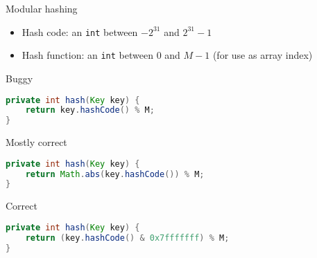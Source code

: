\documentclass[8pt,a4paper,compress]{beamer}
\begin{document}
\begin{frame}[fragile]
Modular hashing
\begin{itemize}
\item Hash code: an \lstinline{int} between $-2^{31}$ and $2^{31} - 1$

\item Hash function: an \lstinline{int} between 0 and $M-1$ (for use as array index)
\end{itemize}

\bigskip

Buggy
\begin{lstlisting}[language=Java]
private int hash(Key key) { 
    return key.hashCode() % M; 
}
\end{lstlisting}

\bigskip

Mostly correct
\begin{lstlisting}[language=Java]
private int hash(Key key) { 
    return Math.abs(key.hashCode()) % M;  
}
\end{lstlisting}


\bigskip

Correct
\begin{lstlisting}[language=Java]
private int hash(Key key) { 
    return (key.hashCode() & 0x7fffffff) % M;
}
\end{lstlisting}
\end{frame}
\end{document}
